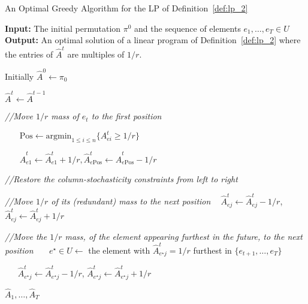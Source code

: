\begin{algorithm}[t]
  \caption{An Optimal Greedy Algorithm for the LP of Definition~\ref{def:lp_2} 
  }\label{alg:greedy_moving}
  \textbf{Input:} The initial permutation $\pi^0$ and the sequence of elements $e_1,\ldots,e_T \in U$\\
  \textbf{Output:} An optimal solution of a linear program of Definition~\ref{def:lp_2} where the  entries of $\hat{A}^t$ are multiples of $1/r$.

 \begin{algorithmic}[1]
        \STATE Initially $\hat{A}^0 \leftarrow \pi_0$
    
        
        \STATE $ \hat{A}^t \leftarrow \hat{A}^{t-1}$
  
            \STATE \emph{//Move $1/r$ mass of $e_t$ to the first position}
            
            \STATE $~~~~~~~~\mathrm{Pos} \leftarrow \text{argmin}_{1 \leq i \leq n} \{A^t_{ei}\geq 1/r\}$
        
            \STATE $~~~~~~~~\hat{A}^t_{e1} \leftarrow \hat{A}^t_{e1} + 1/r, \hat{A}^t_{e\mathrm{Pos}} \leftarrow \hat{A}^t_{e\mathrm{Pos}} - 1/r$
            
            \STATE \emph{//Restore the column-stochasticity constraints from left to right}
        
    
    
                \STATE \emph{//Move $1/r$ of its (redundant) mass to the next position}
                \STATE $~~~~\hat{A}_{ej}^t \leftarrow \hat{A}_{ej}^t - 1/r$, $\hat{A}_{ej}^t \leftarrow \hat{A}_{ej}^t + 1/r$   
    
            \ELSE
            
            \STATE \emph{//Move the $1/r$ mass, of the element appearing furthest in the future, to the next position}
            \STATE $~~~~~~~e^\star \in U \leftarrow$  the element with $\hat{A}_{e^\star j}^t = 1/r$ furthest in $\{e_{t+1},\ldots,e_T\}$
            
            \STATE $~~~~~~~\hat{A}_{e^\star j}^t \leftarrow \hat{A}_{e^\star j}^t - 1/r$, $\hat{A}_{e^\star j}^t \leftarrow \hat{A}_{e^\star j}^t + 1/r$
            \ENDIF    
            \ENDFOR            
            
        \ENDIF 
    
        \ENDFOR
        
        \RETURN $\hat{A}_1,\ldots,\hat{A}_T$
  \end{algorithmic}
\end{algorithm}

